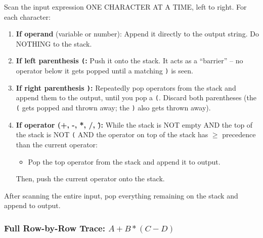 \documentclass[12pt,portrait]{article}
\begin{document}
\begin{rulebox}
Scan the input expression ONE CHARACTER AT A TIME, left to right. For each character:
\begin{enumerate}[leftmargin=*]
    \item \textbf{If operand} (variable or number): Append it directly to the output string. Do NOTHING to the stack.
    \item \textbf{If left parenthesis \texttt{(}:} Push it onto the stack. It acts as a ``barrier'' -- no operator below it gets popped until a matching \texttt{)} is seen.
    \item \textbf{If right parenthesis \texttt{)}:} Repeatedly pop operators from the stack and append them to the output, until you pop a \texttt{(}. Discard both parentheses (the \texttt{(} gets popped and thrown away; the \texttt{)} also gets thrown away).
    \item \textbf{If operator (+, -, *, /, \^):} While the stack is NOT empty AND the top of the stack is NOT \texttt{(} AND the operator on top of the stack has $\geq$ precedence than the current operator:
    \begin{itemize}[leftmargin=*]
        \item Pop the top operator from the stack and append it to output.
    \end{itemize}
    Then, push the current operator onto the stack.
\end{enumerate}
After scanning the entire input, pop everything remaining on the stack and append to output.
\end{rulebox}

\subsubsection{Full Row-by-Row Trace: $A + B * (C - D)$}
\end{document}
